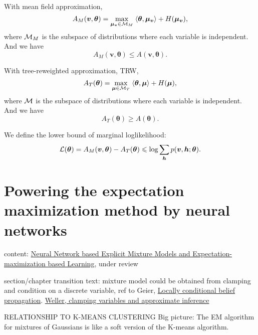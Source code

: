 With mean field approximation,
\begin{equation}
  A_{M}(\bm{v}, \bm{\theta}) = \underset{\bm{\mu}_{\bm{v}} \in \mathcal{M}_M}{\max}\;{ \langle {\bm{\theta}, \bm{\mu}_{\bm{v}}} \rangle + H(\bm{\mu}_{\bm{v}})},
\end{equation}
where $\mathcal{M}_M$ is the subspace of distributions where each variable is independent. And we have
\begin{equation}
  A_{M}(\bm{v}, \bm{\theta}) \leq A(\bm{v}, \bm{\theta}).
\end{equation}

With tree-reweighted approximation, TRW,
\begin{equation}
  A_{T}(\bm{\theta}) = \underset{\bm{\mu} \in \mathcal{M}_T}{\max}\;{ \langle {\bm{\theta}, \bm{\mu}} \rangle + H(\bm{\mu})},
\end{equation}
where $\mathcal{M}$ is the subspace of distributions where each variable is independent. And we have
\begin{equation}
  A_{T}(\bm{\theta}) \geq A( \bm{\theta}).
\end{equation}

We define the lower bound of marginal loglikelihood:
\begin{equation}
  \mathcal{L}(\bm{\theta}) = A_{M}(\bm{v}, \bm{\theta}) - A_{T}(\bm{\theta}) \leqslant \log\sum_{\bm{h}}p(\bm{v}, \bm{h}; \bm{\theta}).
\end{equation}



\chapter{Powering the expectation maximization method by neural networks}
content: \href{https://arxiv.org/abs/1907.13432}{Neural Network based Explicit Mixture Models and Expectation-maximization based Learning}, under review

section/chapter transition text: mixture model could be obtained from clamping and condition on a discrete variable, ref to Geier, \href{http://auai.org/uai2015/proceedings/papers/158.pdf}{Locally conditional belief propagation}. \href{https://papers.nips.cc/paper/5529-clamping-variables-and-approximate-inference.pdf}{Weller, clamping variables and approximate inference}

\begin{remark}
  RELATIONSHIP TO K-MEANS CLUSTERING
  Big picture: The EM algorithm for mixtures of Gaussians is like a soft version of the K-means algorithm.
\end{remark}

